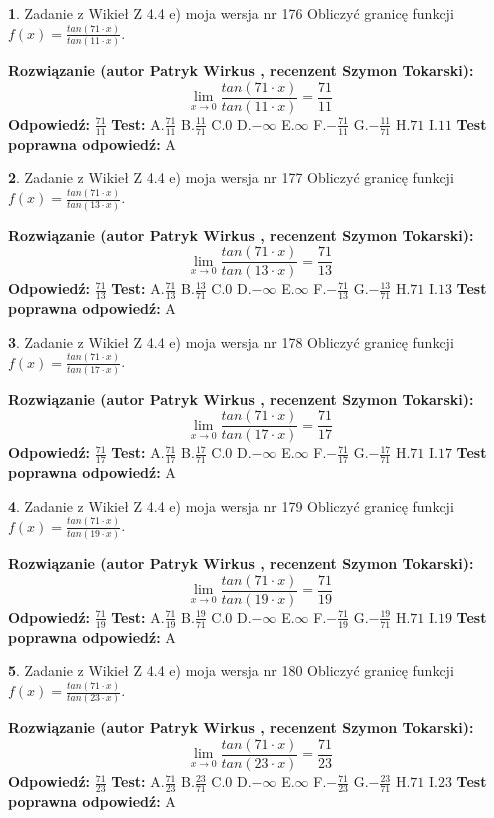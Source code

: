 \documentclass[12pt, a4paper]{article}
\theoremstyle{definition} %
\newtheorem{zad}{}
\newcommand{\zadStart}[1]{\begin{zad}#1\newline}
\newcommand{\zadStop}{\end{zad}}
\newcommand{\rozwStart}[2]{\noindent \textbf{Rozwiązanie (autor #1 , recenzent #2): }\newline}
\newcommand{\rozwStop}{\newline}
\newcommand{\odpStart}{\noindent \textbf{Odpowiedź:}\newline}
\newcommand{\odpStop}{\newline}
\newcommand{\testStart}{\noindent \textbf{Test:}\newline}
\newcommand{\testStop}{\newline}
\newcommand{\kluczStart}{\noindent \textbf{Test poprawna odpowiedź:}\newline}
\newcommand{\kluczStop}{\newline}
\begin{document}
\zadStart{Zadanie z Wikieł Z 4.4 e) moja wersja nr 176}
Obliczyć granicę funkcji $f(x)=\frac{tan(71\cdot x)}{tan(11\cdot x)}$.
\zadStop
\rozwStart{Patryk Wirkus}{Szymon Tokarski}
$$\lim\limits_{x\to 0}\frac{tan(71\cdot x)}{tan(11\cdot x)}=
\frac{71}{11}$$
\rozwStop
\odpStart
$\frac{71}{11}$
\odpStop
\testStart
A.$\frac{71}{11}$
B.$\frac{11}{71}$
C.$0$
D.$-\infty$
E.$\infty$
F.$-\frac{71}{11}$
G.$-\frac{11}{71}$
H.$71$
I.$11$
\testStop
\kluczStart
A
\kluczStop



\zadStart{Zadanie z Wikieł Z 4.4 e) moja wersja nr 177}
Obliczyć granicę funkcji $f(x)=\frac{tan(71\cdot x)}{tan(13\cdot x)}$.
\zadStop
\rozwStart{Patryk Wirkus}{Szymon Tokarski}
$$\lim\limits_{x\to 0}\frac{tan(71\cdot x)}{tan(13\cdot x)}=
\frac{71}{13}$$
\rozwStop
\odpStart
$\frac{71}{13}$
\odpStop
\testStart
A.$\frac{71}{13}$
B.$\frac{13}{71}$
C.$0$
D.$-\infty$
E.$\infty$
F.$-\frac{71}{13}$
G.$-\frac{13}{71}$
H.$71$
I.$13$
\testStop
\kluczStart
A
\kluczStop



\zadStart{Zadanie z Wikieł Z 4.4 e) moja wersja nr 178}
Obliczyć granicę funkcji $f(x)=\frac{tan(71\cdot x)}{tan(17\cdot x)}$.
\zadStop
\rozwStart{Patryk Wirkus}{Szymon Tokarski}
$$\lim\limits_{x\to 0}\frac{tan(71\cdot x)}{tan(17\cdot x)}=
\frac{71}{17}$$
\rozwStop
\odpStart
$\frac{71}{17}$
\odpStop
\testStart
A.$\frac{71}{17}$
B.$\frac{17}{71}$
C.$0$
D.$-\infty$
E.$\infty$
F.$-\frac{71}{17}$
G.$-\frac{17}{71}$
H.$71$
I.$17$
\testStop
\kluczStart
A
\kluczStop



\zadStart{Zadanie z Wikieł Z 4.4 e) moja wersja nr 179}
Obliczyć granicę funkcji $f(x)=\frac{tan(71\cdot x)}{tan(19\cdot x)}$.
\zadStop
\rozwStart{Patryk Wirkus}{Szymon Tokarski}
$$\lim\limits_{x\to 0}\frac{tan(71\cdot x)}{tan(19\cdot x)}=
\frac{71}{19}$$
\rozwStop
\odpStart
$\frac{71}{19}$
\odpStop
\testStart
A.$\frac{71}{19}$
B.$\frac{19}{71}$
C.$0$
D.$-\infty$
E.$\infty$
F.$-\frac{71}{19}$
G.$-\frac{19}{71}$
H.$71$
I.$19$
\testStop
\kluczStart
A
\kluczStop



\zadStart{Zadanie z Wikieł Z 4.4 e) moja wersja nr 180}
Obliczyć granicę funkcji $f(x)=\frac{tan(71\cdot x)}{tan(23\cdot x)}$.
\zadStop
\rozwStart{Patryk Wirkus}{Szymon Tokarski}
$$\lim\limits_{x\to 0}\frac{tan(71\cdot x)}{tan(23\cdot x)}=
\frac{71}{23}$$
\rozwStop
\odpStart
$\frac{71}{23}$
\odpStop
\testStart
A.$\frac{71}{23}$
B.$\frac{23}{71}$
C.$0$
D.$-\infty$
E.$\infty$
F.$-\frac{71}{23}$
G.$-\frac{23}{71}$
H.$71$
I.$23$
\testStop
\kluczStart
A
\kluczStop
\end{document}
